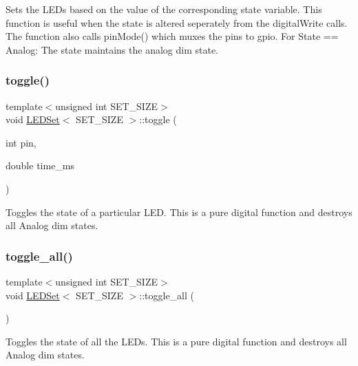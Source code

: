 Sets the L\+E\+Ds based on the value of the corresponding state variable. This function is useful when the state is altered seperately from the digital\+Write calls. The function also calls pin\+Mode() which muxes the pins to gpio. For State == Analog\+: The state maintains the analog dim state. 

\mbox{\label{classLEDSet_a08727d959328a2ecbab6c1e8c6ce4ada}} 
\subsubsection{\texorpdfstring{toggle()}{toggle()}}
{\footnotesize\ttfamily template$<$unsigned int S\+E\+T\+\_\+\+S\+I\+ZE$>$ \\
void \hyperlink{classLEDSet}{L\+E\+D\+Set}$<$ S\+E\+T\+\_\+\+S\+I\+ZE $>$\+::toggle (\begin{DoxyParamCaption}\item[{int}]{pin,  }\item[{double}]{time\+\_\+ms }\end{DoxyParamCaption})\hspace{0.3cm}{\ttfamily [inline]}}



Toggles the state of a particular L\+ED. This is a pure digital function and destroys all Analog dim states. 

\mbox{\label{classLEDSet_ae2bcd287ff637c2600603e83b0981c77}} 
\subsubsection{\texorpdfstring{toggle\+\_\+all()}{toggle\_all()}}
{\footnotesize\ttfamily template$<$unsigned int S\+E\+T\+\_\+\+S\+I\+ZE$>$ \\
void \hyperlink{classLEDSet}{L\+E\+D\+Set}$<$ S\+E\+T\+\_\+\+S\+I\+ZE $>$\+::toggle\+\_\+all (\begin{DoxyParamCaption}{ }\end{DoxyParamCaption})\hspace{0.3cm}{\ttfamily [inline]}}



Toggles the state of all the L\+E\+Ds. This is a pure digital function and destroys all Analog dim states. 

